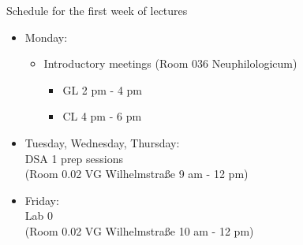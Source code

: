 \documentclass[aspectratio=169,hyperref={unicode},xcolor={dvipsnames}]{beamer}
\begin{document}
\begin{frame}{Schedule for the first week of lectures}
\begin{itemize}
	\item Monday: 
		\begin{itemize}
		\item Introductory meetings (Room 036 Neuphilologicum)
		\begin{itemize}
			\item GL 2 pm - 4 pm
			\item CL 4 pm - 6 pm
		\end{itemize}
		\end{itemize}
	\item Tuesday, Wednesday, Thursday: \\ DSA 1 prep sessions \\(Room 0.02 VG Wilhelmstraße 9 am - 12 pm)
	\item Friday: \\Lab 0 \\(Room 0.02 VG Wilhelmstraße 10 am - 12 pm)
	
\end{itemize}
\end{frame}
\end{document}
